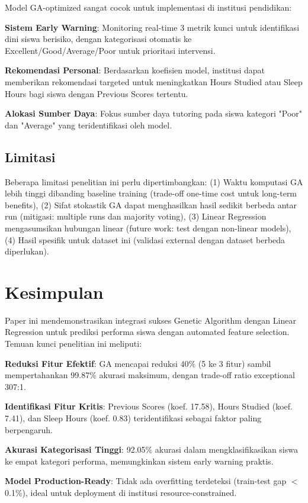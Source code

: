 \documentclass[conference]{IEEEtran}
\begin{document}
Model GA-optimized sangat cocok untuk implementasi di institusi pendidikan:

\textbf{Sistem Early Warning}: Monitoring real-time 3 metrik kunci untuk identifikasi dini siswa berisiko, dengan kategorisasi otomatis ke Excellent/Good/Average/Poor untuk prioritasi intervensi.

\textbf{Rekomendasi Personal}: Berdasarkan koefisien model, institusi dapat memberikan rekomendasi targeted untuk meningkatkan Hours Studied atau Sleep Hours bagi siswa dengan Previous Scores tertentu.

\textbf{Alokasi Sumber Daya}: Fokus sumber daya tutoring pada siswa kategori "Poor" dan "Average" yang teridentifikasi oleh model.

\subsection{Limitasi}

Beberapa limitasi penelitian ini perlu dipertimbangkan: (1) Waktu komputasi GA lebih tinggi dibanding baseline training (trade-off one-time cost untuk long-term benefits), (2) Sifat stokastik GA dapat menghasilkan hasil sedikit berbeda antar run (mitigasi: multiple runs dan majority voting), (3) Linear Regression mengasumsikan hubungan linear (future work: test dengan non-linear models), (4) Hasil spesifik untuk dataset ini (validasi external dengan dataset berbeda diperlukan).

\section{Kesimpulan}

Paper ini mendemonstrasikan integrasi sukses Genetic Algorithm dengan Linear Regression untuk prediksi performa siswa dengan automated feature selection. Temuan kunci penelitian ini meliputi:

\textbf{Reduksi Fitur Efektif}: GA mencapai reduksi 40\% (5 ke 3 fitur) sambil mempertahankan 99.87\% akurasi maksimum, dengan trade-off ratio exceptional 307:1.

\textbf{Identifikasi Fitur Kritis}: Previous Scores (koef. 17.58), Hours Studied (koef. 7.41), dan Sleep Hours (koef. 0.83) teridentifikasi sebagai faktor paling berpengaruh.

\textbf{Akurasi Kategorisasi Tinggi}: 92.05\% akurasi dalam mengklasifikasikan siswa ke empat kategori performa, memungkinkan sistem early warning praktis.

\textbf{Model Production-Ready}: Tidak ada overfitting terdeteksi (train-test gap $<$0.1\%), ideal untuk deployment di institusi resource-constrained.
\end{document}
